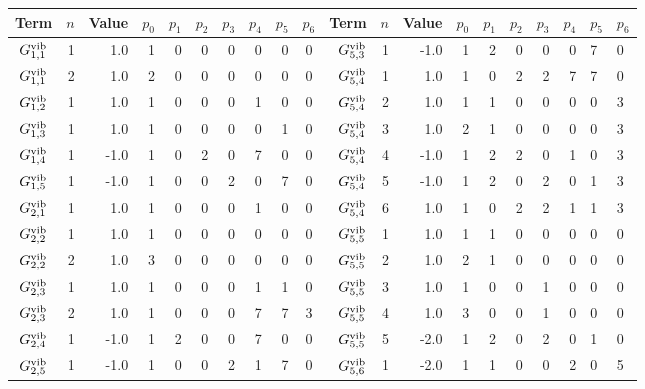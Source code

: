     \begin{tabular}{crrrrrrrrcrrrrrrrr}
        \hline
        \hline
            Term  & $n$ & Value & $p_0$ & $p_1$ & $p_2$ & $p_3$ & $p_4$ & $p_5$ & $p_6$ & Term  & $n$ & Value & $p_0$ & $p_1$ & $p_2$ & $p_3$ & $p_4$ & $p_5$ & $p_6$ \\
        \hline
    $ G^{\rm vib}_{  1, 1}  $& 1 &  1.0 & 1 & 0 & 0 & 0 & 0 & 0 & 0 &     $    G^{\rm vib}_{ 5, 3}  $&  1  & -1.0 & 1 & 2 & 0 & 0 & 0 & 7 & 0\\
    $ G^{\rm vib}_{  1, 1}  $& 2 &  1.0 & 2 & 0 & 0 & 0 & 0 & 0 & 0 &     $    G^{\rm vib}_{ 5, 4}  $&  1  &  1.0 & 1 & 0 & 2 & 2 & 7 & 7 & 0\\
    $ G^{\rm vib}_{  1, 2}  $& 1 &  1.0 & 1 & 0 & 0 & 0 & 1 & 0 & 0 &     $    G^{\rm vib}_{ 5, 4}  $&  2  &  1.0 & 1 & 1 & 0 & 0 & 0 & 0 & 3\\
    $ G^{\rm vib}_{  1, 3}  $& 1 &  1.0 & 1 & 0 & 0 & 0 & 0 & 1 & 0 &     $    G^{\rm vib}_{ 5, 4}  $&  3  &  1.0 & 2 & 1 & 0 & 0 & 0 & 0 & 3\\
    $ G^{\rm vib}_{  1, 4}  $& 1 & -1.0 & 1 & 0 & 2 & 0 & 7 & 0 & 0 &     $    G^{\rm vib}_{ 5, 4}  $&  4  & -1.0 & 1 & 2 & 2 & 0 & 1 & 0 & 3\\
    $ G^{\rm vib}_{  1, 5}  $& 1 & -1.0 & 1 & 0 & 0 & 2 & 0 & 7 & 0 &     $    G^{\rm vib}_{ 5, 4}  $&  5  & -1.0 & 1 & 2 & 0 & 2 & 0 & 1 & 3\\
    $ G^{\rm vib}_{  2, 1}  $& 1 &  1.0 & 1 & 0 & 0 & 0 & 1 & 0 & 0 &     $    G^{\rm vib}_{ 5, 4}  $&  6  &  1.0 & 1 & 0 & 2 & 2 & 1 & 1 & 3\\
    $ G^{\rm vib}_{  2, 2}  $& 1 &  1.0 & 1 & 0 & 0 & 0 & 0 & 0 & 0 &     $    G^{\rm vib}_{ 5, 5}  $&  1  &  1.0 & 1 & 1 & 0 & 0 & 0 & 0 & 0\\
    $ G^{\rm vib}_{  2, 2}  $& 2 &  1.0 & 3 & 0 & 0 & 0 & 0 & 0 & 0 &     $    G^{\rm vib}_{ 5, 5}  $&  2  &  1.0 & 2 & 1 & 0 & 0 & 0 & 0 & 0\\
    $ G^{\rm vib}_{  2, 3}  $& 1 &  1.0 & 1 & 0 & 0 & 0 & 1 & 1 & 0 &     $    G^{\rm vib}_{ 5, 5}  $&  3  &  1.0 & 1 & 0 & 0 & 1 & 0 & 0 & 0\\
    $ G^{\rm vib}_{  2, 3}  $& 2 &  1.0 & 1 & 0 & 0 & 0 & 7 & 7 & 3 &     $    G^{\rm vib}_{ 5, 5}  $&  4  &  1.0 & 3 & 0 & 0 & 1 & 0 & 0 & 0\\
    $ G^{\rm vib}_{  2, 4}  $& 1 & -1.0 & 1 & 2 & 0 & 0 & 7 & 0 & 0 &     $    G^{\rm vib}_{ 5, 5}  $&  5  & -2.0 & 1 & 2 & 0 & 2 & 0 & 1 & 0\\
    $ G^{\rm vib}_{  2, 5}  $& 1 & -1.0 & 1 & 0 & 0 & 2 & 1 & 7 & 0 &     $    G^{\rm vib}_{ 5, 6}  $&  1  & -2.0 & 1 & 1 & 0 & 0 & 2 & 0 & 5\\

\end{tabular}
